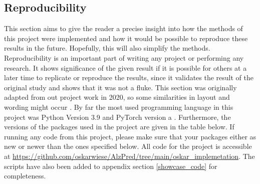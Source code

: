 \documentclass[12pt, fleqn, titlepage]{article}
\begin{document}
\subsection{Reproducibility}\label{reproducibility}
This section aims to give the reader a precise insight into how the methods of this project were implemented and how it would be possible to reproduce these results in the future. Hopefully, this will also simplify the methods. Reproducibility is an important part of writing any project or performing any research. It shows significance of the given result if it is possible for others at a later time to replicate or reproduce the results, since it validates the result of the original study and shows that it was not a fluke. This section was originally adapted from out project work in 2020, so some similarities in layout and wording might occur \cite{fagproject}. By far the most used programming language in this project was Python Version 3.9 and PyTorch version a \cite{python, pytorch}. %
Furthermore, the versions of the packages used in the project are given in the table below. If running any code from this project, please make sure that your packages either as new or newer than the ones specified below. All code for the project is accessible at \url{https://github.com/oskarwiese/AlzPred/tree/main/oskar_implemetation}. %
 The scripts have also been added to appendix section \ref{showcase_code} for completeness.
\end{document}
